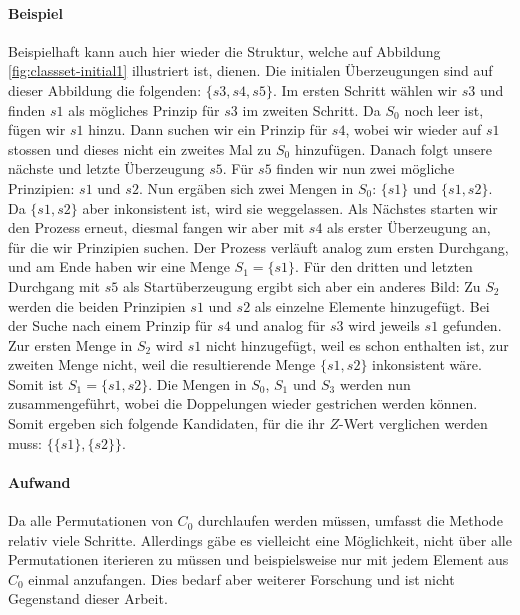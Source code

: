 \documentclass{article}
\begin{document}
\paragraph{Beispiel}
Beispielhaft kann auch hier wieder die Struktur, welche auf Abbildung \ref{fig:classset-initial1} illustriert ist, dienen. Die initialen Überzeugungen sind auf dieser Abbildung die folgenden: $\{s3, s4, s5\}$. Im ersten Schritt wählen wir $s3$ und finden $s1$ als mögliches Prinzip für $s3$ im zweiten Schritt. Da $S_0$ noch leer ist, fügen wir $s1$ hinzu. Dann suchen wir ein Prinzip für $s4$, wobei wir wieder auf $s1$ stossen und dieses nicht ein zweites Mal zu $S_0$ hinzufügen. Danach folgt unsere nächste und letzte Überzeugung $s5$. Für $s5$ finden wir nun zwei mögliche Prinzipien: $s1$ und $s2$. Nun ergäben sich zwei Mengen in $S_0$: $\{s1\}$ und $\{s1, s2\}$. Da $\{s1, s2\}$ aber inkonsistent ist, wird sie weggelassen. Als Nächstes starten wir den Prozess erneut, diesmal fangen wir aber mit $s4$ als erster Überzeugung an, für die wir Prinzipien suchen. Der Prozess verläuft analog zum ersten Durchgang, und am Ende haben wir eine Menge $S_1 = \{s1\}$. Für den dritten und letzten Durchgang mit $s5$ als Startüberzeugung ergibt sich aber ein anderes Bild: Zu $S_2$ werden die beiden Prinzipien $s1$ und $s2$ als einzelne Elemente hinzugefügt. Bei der Suche nach einem Prinzip für $s4$ und analog für $s3$ wird jeweils $s1$ gefunden. Zur ersten Menge in $S_2$ wird $s1$ nicht hinzugefügt, weil es schon enthalten ist, zur zweiten Menge nicht, weil die resultierende Menge $\{s1,s2\}$ inkonsistent wäre. Somit ist $S_1 = \{{s1}, {s2}\}$. Die Mengen in $S_0$, $S_1$ und $S_3$ werden nun zusammengeführt, wobei die Doppelungen wieder gestrichen werden können. Somit ergeben sich folgende Kandidaten, für die ihr $Z$-Wert verglichen werden muss: $\{\{s1\}, \{s2\}\}$.

\paragraph{Aufwand}
Da alle Permutationen von $C_0$ durchlaufen werden müssen, umfasst die Methode relativ viele Schritte. Allerdings gäbe es vielleicht eine Möglichkeit, nicht über alle Permutationen iterieren zu müssen und beispielsweise nur mit jedem Element aus $C_0$ einmal anzufangen. Dies bedarf aber weiterer Forschung und ist nicht Gegenstand dieser Arbeit.
\end{document}
